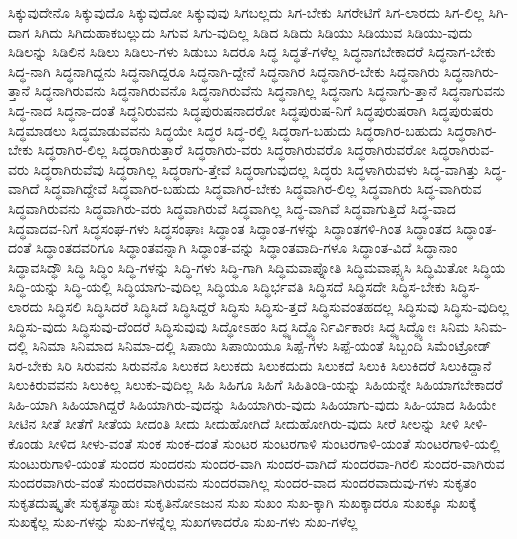 {ಸಿಕ್ಕುವುದೇನೊ
ಸಿಕ್ಕುವುದೊ
ಸಿಕ್ಕುವುದೋ
ಸಿಕ್ಕುವುವು
ಸಿಗಬಲ್ಲದು
ಸಿಗ-ಬೇಕು
ಸಿಗರೇಟಿಗೆ
ಸಿಗ-ಲಾರದು
ಸಿಗ-ಲಿಲ್ಲ
ಸಿಗಿ-ದಾಗ
ಸಿಗಿದು
ಸಿಗಿದುಹಾಕಬಲ್ಲುದು
ಸಿಗುವ
ಸಿಗು-ವುದಿಲ್ಲ
ಸಿಡಿದ
ಸಿಡಿದು
ಸಿಡಿಯು
ಸಿಡಿಯುವ
ಸಿಡಿಯು-ವುದು
ಸಿಡಿಲನ್ನು
ಸಿಡಿಲಿನ
ಸಿಡಿಲು
ಸಿಡಿಲು-ಗಳು
ಸಿಡುಬು
ಸಿದರೂ
ಸಿದ್ಧ
ಸಿದ್ಧತೆ-ಗಳೆಲ್ಲ
ಸಿದ್ಧನಾಗಬೇಕಾದರೆ
ಸಿದ್ಧನಾಗ-ಬೇಕು
ಸಿದ್ಧ-ನಾಗಿ
ಸಿದ್ಧನಾಗಿದ್ದನು
ಸಿದ್ಧನಾಗಿದ್ದರೂ
ಸಿದ್ಧನಾಗಿ-ದ್ದೇನೆ
ಸಿದ್ಧನಾಗಿರ
ಸಿದ್ಧನಾಗಿರ-ಬೇಕು
ಸಿದ್ಧನಾಗಿರು
ಸಿದ್ಧನಾಗಿರು-ತ್ತಾನೆ
ಸಿದ್ಧನಾಗಿರುವನು
ಸಿದ್ಧನಾಗಿರುವನೊ
ಸಿದ್ಧನಾಗಿರುವೆನು
ಸಿದ್ಧನಾಗಿಲ್ಲ
ಸಿದ್ಧನಾಗು
ಸಿದ್ಧನಾಗು-ತ್ತಾನೆ
ಸಿದ್ಧನಾಗುವನು
ಸಿದ್ಧ-ನಾದ
ಸಿದ್ಧನಾ-ದಂತೆ
ಸಿದ್ಧನಿರುವನು
ಸಿದ್ಧಪುರುಷನಾದರೋ
ಸಿದ್ಧಪುರುಷ-ನಿಗೆ
ಸಿದ್ಧಪುರುಷರಾಗಿ
ಸಿದ್ಧಪುರುಷರು
ಸಿದ್ಧಮಾಡಲು
ಸಿದ್ಧಮಾಡುವವನು
ಸಿದ್ಧಯೇ
ಸಿದ್ಧರ
ಸಿದ್ಧ-ರಲ್ಲಿ
ಸಿದ್ಧರಾಗ-ಬಹುದು
ಸಿದ್ಧರಾಗಿರ-ಬಹುದು
ಸಿದ್ಧರಾಗಿರ-ಬೇಕು
ಸಿದ್ಧರಾಗಿರ-ಲಿಲ್ಲ
ಸಿದ್ಧರಾಗಿರುತ್ತಾರೆ
ಸಿದ್ಧರಾಗಿರು-ವರು
ಸಿದ್ಧರಾಗಿರುವರೊ
ಸಿದ್ಧರಾಗಿರುವರೋ
ಸಿದ್ಧರಾಗಿರುವ-ವರು
ಸಿದ್ಧರಾಗಿರುವೆವು
ಸಿದ್ಧರಾಗಿಲ್ಲ
ಸಿದ್ಧರಾಗು-ತ್ತೇವೆ
ಸಿದ್ಧರಾಗುವುದಲ್ಲ
ಸಿದ್ಧರು
ಸಿದ್ಧಳಾಗಿರುವಳು
ಸಿದ್ಧ-ವಾಗಿತ್ತು
ಸಿದ್ಧ-ವಾಗಿದೆ
ಸಿದ್ಧವಾಗಿದ್ದೇವೆ
ಸಿದ್ಧವಾಗಿರ-ಬಹುದು
ಸಿದ್ಧವಾಗಿರ-ಬೇಕು
ಸಿದ್ಧವಾಗಿರ-ಲಿಲ್ಲ
ಸಿದ್ಧವಾಗಿರು
ಸಿದ್ಧ-ವಾಗಿರುವ
ಸಿದ್ಧವಾಗಿರುವನು
ಸಿದ್ಧವಾಗಿರು-ವರು
ಸಿದ್ಧವಾಗಿರುವೆ
ಸಿದ್ಧವಾಗಿಲ್ಲ
ಸಿದ್ಧ-ವಾಗಿವೆ
ಸಿದ್ಧವಾಗುತ್ತಿದೆ
ಸಿದ್ಧ-ವಾದ
ಸಿದ್ಧವಾದವ-ನಿಗೆ
ಸಿದ್ಧಸಂಘ-ಗಳು
ಸಿದ್ಧಸಂಘಾಃ
ಸಿದ್ಧಾಂತ
ಸಿದ್ಧಾಂತ-ಗಳನ್ನು
ಸಿದ್ಧಾಂತಗಳಿ-ಗಿಂತ
ಸಿದ್ಧಾಂತದ
ಸಿದ್ಧಾಂತ-ದಂತೆ
ಸಿದ್ಧಾಂತದವರಿಗೂ
ಸಿದ್ಧಾಂತವನ್ನಾಗಿ
ಸಿದ್ಧಾಂತ-ವನ್ನು
ಸಿದ್ಧಾಂತವಾದಿ-ಗಳೂ
ಸಿದ್ಧಾಂತ-ವಿದೆ
ಸಿದ್ಧಾನಾಂ
ಸಿದ್ಧಾವಸಿದ್ಧೌ
ಸಿದ್ಧಿ
ಸಿದ್ಧಿಂ
ಸಿದ್ಧಿ-ಗಳನ್ನು
ಸಿದ್ಧಿ-ಗಳು
ಸಿದ್ಧಿ-ಗಾಗಿ
ಸಿದ್ಧಿಮವಾಪ್ನೋತಿ
ಸಿದ್ಧಿಮವಾಪ್ಸ್ಯಸಿ
ಸಿದ್ಧಿಮಿತೋ
ಸಿದ್ಧಿಯ
ಸಿದ್ಧಿ-ಯನ್ನು
ಸಿದ್ಧಿ-ಯಲ್ಲಿ
ಸಿದ್ಧಿಯಾಗು-ವುದಿಲ್ಲ
ಸಿದ್ಧಿಯೂ
ಸಿದ್ಧಿರ್ಭವತಿ
ಸಿದ್ಧಿಸದೆ
ಸಿದ್ಧಿಸದೇ
ಸಿದ್ಧಿಸ-ಬೇಕು
ಸಿದ್ಧಿಸ-ಲಾರದು
ಸಿದ್ಧಿಸಲಿ
ಸಿದ್ಧಿಸಿದರೆ
ಸಿದ್ಧಿಸಿದೆ
ಸಿದ್ಧಿಸಿದ್ದರೆ
ಸಿದ್ಧಿಸು
ಸಿದ್ಧಿಸು-ತ್ತದೆ
ಸಿದ್ಧಿಸುವಂತಹದಲ್ಲ
ಸಿದ್ಧಿಸುವು
ಸಿದ್ಧಿಸು-ವುದಿಲ್ಲ
ಸಿದ್ಧಿಸು-ವುದು
ಸಿದ್ಧಿಸುವು-ದೆಂದರೆ
ಸಿದ್ಧಿಸುವುವು
ಸಿದ್ಧೋಽಹಂ
ಸಿದ್ಧ್ಯಸಿದ್ಧ್ಯೊರ್ನಿರ್ವಿಕಾರಃ
ಸಿದ್ಧ್ಯಸಿದ್ಧ್ಯೋಃ
ಸಿನಿಮ
ಸಿನಿಮ-ದಲ್ಲಿ
ಸಿನಿಮಾ
ಸಿನಿಮಾದ
ಸಿನಿಮಾ-ದಲ್ಲಿ
ಸಿಪಾಯಿ
ಸಿಪಾಯಿಯೂ
ಸಿಪ್ಪೆ-ಗಳು
ಸಿಪ್ಪೆ-ಯಂತೆ
ಸಿಬ್ಬಂದಿ
ಸಿಮೆಂಟ್ರೋಡ್
ಸಿರ-ಬೇಕು
ಸಿರಿ
ಸಿರುವನು
ಸಿರುವನೊ
ಸಿಲುಕದ
ಸಿಲುಕದು
ಸಿಲುಕದುದು
ಸಿಲುಕದೆ
ಸಿಲುಕಿ
ಸಿಲುಕಿದರೆ
ಸಿಲುಕಿದ್ದಾನೆ
ಸಿಲುಕಿರುವವನು
ಸಿಲುಕಿಲ್ಲ
ಸಿಲುಕು-ವುದಿಲ್ಲ
ಸಿಹಿ
ಸಿಹಿಗೂ
ಸಿಹಿಗೆ
ಸಿಹಿತಿಂಡಿ-ಯನ್ನು
ಸಿಹಿಯನ್ನೇ
ಸಿಹಿಯಾಗಬೇಕಾದರೆ
ಸಿಹಿ-ಯಾಗಿ
ಸಿಹಿಯಾಗಿದ್ದರೆ
ಸಿಹಿಯಾಗಿರು-ವುದನ್ನು
ಸಿಹಿಯಾಗಿರು-ವುದು
ಸಿಹಿಯಾಗು-ವುದು
ಸಿಹಿ-ಯಾದ
ಸಿಹಿಯೇ
ಸೀಟಿನ
ಸೀತೆ
ಸೀತೆಗೆ
ಸೀತೆಯ
ಸೀದಂತಿ
ಸೀದು
ಸೀದುಹೋಗಿದೆ
ಸೀದುಹೋಗಿರು-ವುದು
ಸೀರೆ
ಸೀಲನ್ನು
ಸೀಳಿ
ಸೀಳಿ-ಕೊಂಡು
ಸೀಳಿದ
ಸೀಳು-ವಂತೆ
ಸುಂಕ
ಸುಂಕ-ದಂತೆ
ಸುಂಟರ
ಸುಂಟರಗಾಳಿ
ಸುಂಟರಗಾಳಿ-ಯಂತೆ
ಸುಂಟರಗಾಳಿ-ಯಲ್ಲಿ
ಸುಂಟುರುಗಾಳಿ-ಯಂತೆ
ಸುಂದರ
ಸುಂದರನು
ಸುಂದರ-ವಾಗಿ
ಸುಂದರ-ವಾಗಿದೆ
ಸುಂದರವಾ-ಗಿರಲಿ
ಸುಂದರ-ವಾಗಿರುವ
ಸುಂದರವಾಗಿರು-ವಂತೆ
ಸುಂದರವಾಗಿರುವನು
ಸುಂದರವಾಗಿಲ್ಲ
ಸುಂದರ-ವಾದ
ಸುಂದರವಾದುವು-ಗಳು
ಸುಕೃತಂ
ಸುಕೃತದುಷ್ಕೃತೇ
ಸುಕೃತಸ್ಯಾಹುಃ
ಸುಕೃತಿನೋಽಜುನ
ಸುಖ
ಸುಖಂ
ಸುಖ-ಕ್ಕಾಗಿ
ಸುಖಕ್ಕಾದರೂ
ಸುಖಕ್ಕೂ
ಸುಖಕ್ಕೆ
ಸುಖಕ್ಕೆಲ್ಲ
ಸುಖ-ಗಳನ್ನು
ಸುಖ-ಗಳನ್ನೆಲ್ಲ
ಸುಖಗಳಾದರೊ
ಸುಖ-ಗಳು
ಸುಖ-ಗಳೆಲ್ಲ
}
